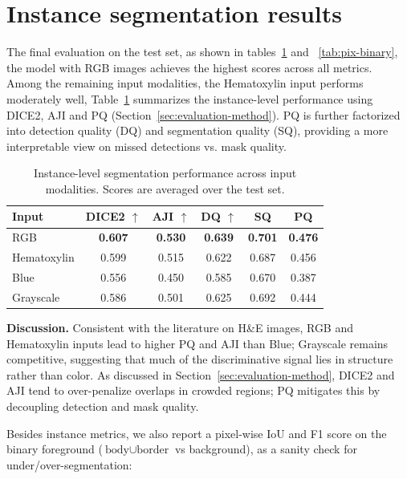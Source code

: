 \documentclass[target=bach,aauheader=,style=]{thud}
\begin{document}
\section{Instance segmentation results}
The final evaluation on the test set, as shown in tables~\ref{tab:iou-results} and ~\ref{tab:pix-binary}, the model with RGB images achieves the highest scores across all metrics.\\
Among the remaining input modalities, the Hematoxylin input performs moderately well,  
Table~\ref{tab:iou-results}  summarizes the instance-level performance using DICE2, AJI and PQ (Section~\ref{sec:evaluation-method}). 
PQ is further factorized into detection quality (DQ) and segmentation quality (SQ), providing a more interpretable view on missed detections vs. mask quality.

\begin{table}[ht]
\centering
\caption{Instance-level segmentation performance across input modalities. Scores are averaged over the test set.}
\label{tab:iou-results}
\small
\begin{tabular}{lccccc}
\toprule
\textbf{Input} & \textbf{DICE2} $\uparrow$ & \textbf{AJI} $\uparrow$ & \textbf{DQ} $\uparrow$ & \textbf{SQ} & \textbf{PQ}\\
\midrule
RGB         & \textbf{0.607} & \textbf{0.530} & \textbf{0.639} & \textbf{0.701} & \textbf{0.476}\\
Hematoxylin & 0.599 & 0.515 & 0.622 & 0.687 & 0.456\\
Blue        & 0.556 & 0.450 & 0.585 & 0.670 & 0.387\\
Grayscale   & 0.586 & 0.501 & 0.625 & 0.692 & 0.444\\
\bottomrule
\end{tabular}
\end{table}

\noindent\textbf{Discussion.} 
Consistent with the literature on H\&E images, RGB and Hematoxylin inputs lead to higher PQ and AJI than Blue; Grayscale remains competitive, suggesting that much of the discriminative signal lies in structure rather than color. 
As discussed in Section~\ref{sec:evaluation-method}, DICE2 and AJI tend to over-penalize overlaps in crowded regions; PQ mitigates this by decoupling detection and mask quality.

Besides instance metrics, we also report a pixel-wise IoU and F1 score on the binary foreground ($\text{body}\cup\text{border}$ vs background), as a sanity check for under/over-segmentation:
\end{document}
